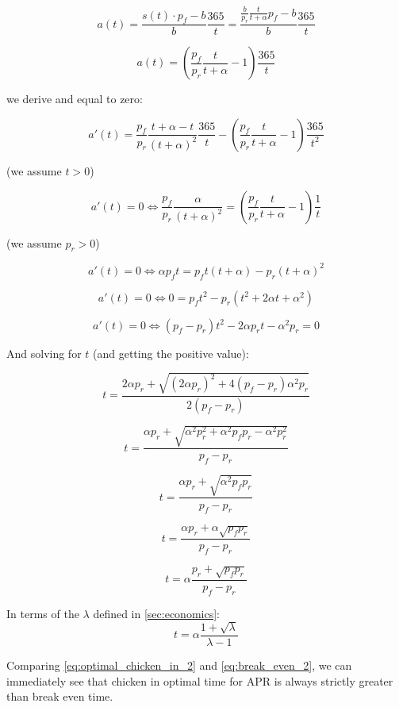 \documentclass{article}
\begin{document}
\[
a(t) = \frac{s(t) \cdot p_f - b}{b} \frac{365}{t} = \frac{\frac{b}{p_r} \frac{t}{t+\alpha} p_f - b}{b} \frac{365}{t}
\]

\begin{equation}
  \label{eq:apr}
a(t) = \left(\frac{p_f}{p_r} \frac{t}{t+\alpha} - 1\right) \frac{365}{t}
\end{equation}

we derive and equal to zero:

\[
a'(t) = \frac{p_f}{p_r} \frac{t + \alpha - t}{(t+\alpha)^2} \frac{365}{t} - \left(\frac{p_f}{p_r} \frac{t}{t+\alpha} - 1\right) \frac{365}{t^2}
\]

(we assume $t > 0$)

\[
a'(t) = 0 \iff \frac{p_f}{p_r} \frac{\alpha}{(t+\alpha)^2} = \left(\frac{p_f}{p_r} \frac{t}{t+\alpha} - 1\right) \frac{1}{t}
\]

(we assume $p_r > 0$)

\[
a'(t) = 0 \iff \alpha p_f t = p_f t(t+\alpha)  - p_r(t+\alpha)^2
\]

\[
a'(t) = 0 \iff 0 = p_f t^2 - p_r(t^2+2\alpha t+\alpha^2)
\]

\[
a'(t) = 0 \iff (p_f-p_r)t^2  - 2\alpha p_r t - \alpha^2 p_r = 0
\]

And solving for $t$ (and getting the positive value):

\[
t = \frac{2\alpha p_r + \sqrt{(2\alpha p_r)^2 + 4(p_f-p_r) \alpha^2 p_r}}{2(p_f-p_r)}
\]

\[
t = \frac{\alpha p_r + \sqrt{\alpha^2 p_r^2 + \alpha^2 p_f p_r- \alpha^2 p_r^2}}{p_f-p_r}
\]

\[
t = \frac{\alpha p_r + \sqrt{\alpha^2 p_f p_r}}{p_f-p_r}
\]

\[
t = \frac{\alpha p_r + \alpha \sqrt{p_f p_r}}{p_f-p_r}
\]

\begin{equation}
  \label{eq:optimal_chicken_in_1}
t = \alpha \frac{p_r + \sqrt{p_f p_r}}{p_f-p_r}
\end{equation}

In terms of the $\lambda$ defined in \ref{sec:economics}:
\begin{equation}
  \label{eq:optimal_chicken_in_2}
t = \alpha \frac{1 + \sqrt{\lambda}}{\lambda - 1}
\end{equation}

Comparing \ref{eq:optimal_chicken_in_2} and \ref{eq:break_even_2}, we can immediately see that chicken in optimal time for APR is always strictly greater than break even time.
\end{document}
